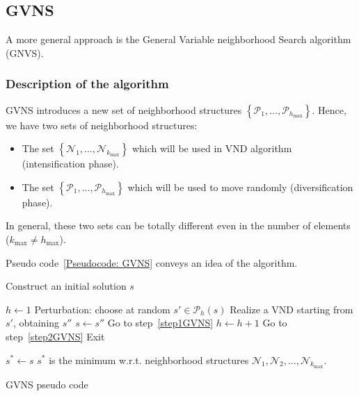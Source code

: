 \subsection{GVNS}
\label{sec:GVNS}
A more general approach is the General Variable neighborhood Search algorithm (GNVS).

\subsubsection{Description of the algorithm}
GVNS introduces a new set of neighborhood structures $ \left\{\mathcal P_1,\dots,\mathcal P_{h_\mathrm{max}}\right\}$. Hence, we have two sets of neighborhood structures:
\begin{itemize}
	\item The set $\left\{\mathcal N_1,\dots,\mathcal N_{k_\mathrm{max}}\right\}$ which will be used in VND algorithm (intensification phase).
	\item The set $ \left\{\mathcal P_1,\dots,\mathcal P_{h_\mathrm{max}}\right\}$ which will be used to move randomly (diversification phase).
\end{itemize}
 In general,  these two sets can be totally  different even in the number of elements ($k_\mathrm{max}\neq h_\mathrm{max}$).

Pseudo code~\ref{Pseudocode: GVNS} conveys an idea of the algorithm.

\begin{algorithm}
	Construct an initial solution $s$\;
	{
		$h \gets 1$\; \label{step1GVNS}
		Perturbation: choose at random   $s'\in \mathcal P_h(s)$\; \label{step2GVNS}
		Realize a VND starting from $s'$, obtaining $s''$\;
		{
			$s \gets s''$\;
			Go to step~\ref{step1GVNS}\;
		}
		{ 
			$h \gets h+1$\;
			Go to step~\ref{step2GVNS}\;}
	{Exit}
		
	}
	$s^* \gets s$\;
	$s^*$ is the minimum w.r.t. neighborhood structures $\mathcal N_1,\mathcal N_2,\dots,\mathcal N_{k_\mathrm{max}}$.
	\caption{GVNS pseudo code}
	\label{Pseudocode: GVNS}
	
\end{algorithm}

